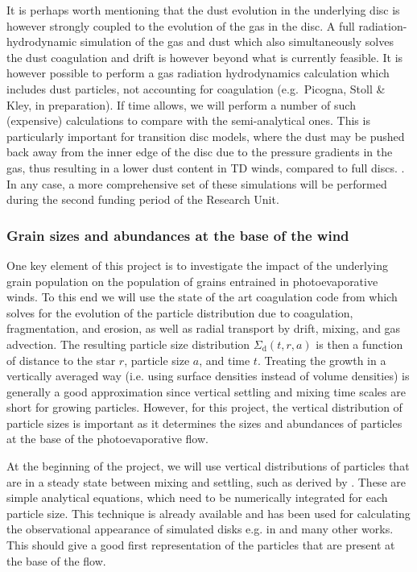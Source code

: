 \documentclass[10pt,fleqn,twoside]{article}
\begin{document}
It is perhaps worth mentioning that the dust evolution in the
underlying disc is however strongly coupled to the evolution of the gas
in the disc. A full radiation-hydrodynamic simulation of the gas and
dust which also simultaneously solves the dust coagulation and drift
is however beyond what is currently feasible. It is however possible
to perform a gas radiation hydrodynamics calculation which includes
dust particles, not accounting for coagulation (e.g.\ Picogna, Stoll \&
Kley,
in preparation). If time allows, we will perform a number of such
(expensive) calculations to compare with the semi-analytical
ones. This is particularly important for transition disc models, where
the dust may be pushed back away from the inner edge of the disc due
to the pressure gradients in the gas, thus resulting in a  lower dust
content in TD winds, compared to full discs. . In any case, a more
comprehensive set of these simulations will be performed during the
second funding period of the Research Unit.  

\subsubsection{Grain sizes and abundances at the base of the wind}

One key element of this project is to investigate the impact of the
underlying grain population on the population of grains entrained in
photoevaporative
winds. To this end we will use the state of the art coagulation code
from \citet{2010A&A...513A..79B} which solves for the evolution of the
particle distribution due to coagulation, fragmentation, and erosion,
as well as radial transport by drift, mixing, and gas advection. The
resulting particle size distribution $\Sigma_\mathrm{d}(t,r,a)$ is
then a function of distance to the star $r$, particle size $a$, and
time $t$. Treating the growth in a vertically averaged way (i.e.
using surface densities instead of volume densities) is generally a
good approximation since vertical settling and mixing time scales are
short for growing particles. However, for this project, the vertical
distribution of particle sizes is important as it determines the sizes
and abundances of particles at the base of the photoevaporative flow.

At the beginning of the project, we will use vertical distributions of
particles that are in a steady state between mixing and settling, such
as derived by \citet{2009A&A...496..597F}. These are simple analytical
equations, which need to be numerically integrated for each particle
size. This technique is already available and has been used for
calculating the observational appearance of simulated disks e.g.
in \citet{2015ApJ...813L..14B} and many other works. This should give
a good first representation of the particles that are present at the
base of the flow.
\end{document}
